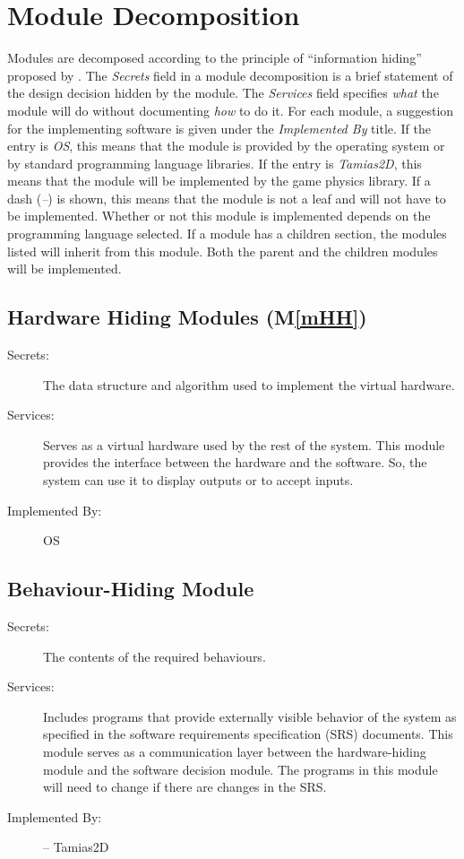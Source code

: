 \documentclass[12pt]{article}
\newcommand{\mref}[1]{M\ref{#1}}
\newcommand{\progname}{Tamias2D}
\begin{document}
\section{Module Decomposition} \label{SecMD}

Modules are decomposed according to the principle of ``information hiding''
proposed by \citet{ParnasEtAl1984}. The \emph{Secrets} field in a module
decomposition is a brief statement of the design decision hidden by the
module. The \emph{Services} field specifies \emph{what} the module will do
without documenting \emph{how} to do it. For each module, a suggestion for the implementing software is given under the \emph{Implemented By} title. If the entry is \emph{OS}, this means that the module is provided by the operating system or by standard programming language libraries. If the entry is \emph{\progname}, this means that the module will be implemented by the game physics library.  
If a dash (\emph{--}) is shown, this means
that the module is not a leaf and will not have to be implemented. Whether or
not this module is implemented depends on the programming language
selected.
If a module has a children section, the modules listed will inherit from  
this module. Both the parent and the children modules will be implemented.

\subsection{Hardware Hiding Modules (\mref{mHH})}

\begin{description}
\item[Secrets:]The data structure and algorithm used to implement the virtual
  hardware.
\item[Services:] Serves as a virtual hardware used by the rest of the
  system. This module provides the interface between the hardware and the
  software. So, the system can use it to display outputs or to accept inputs.
\item[Implemented By:] OS
\end{description}

\subsection{Behaviour-Hiding Module}

\begin{description}
\item[Secrets:]The contents of the required behaviours.
\item[Services:]Includes programs that provide externally visible behavior of
  the system as specified in the software requirements specification (SRS)
  documents. This module serves as a communication layer between the
  hardware-hiding module and the software decision module. The programs in this module will need to change if there are changes in the SRS.
\item[Implemented By:] -- {\progname}
\end{description}
\end{document}
